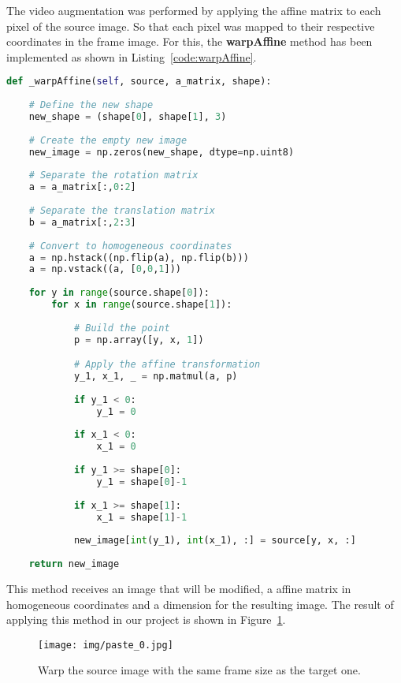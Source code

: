 \documentclass[]{IEEEtran}
\begin{document}
The video augmentation was performed by applying the affine matrix to each pixel of the source image. So that each pixel was mapped to their respective coordinates in the frame image. For this, the \textbf{warpAffine} method has been implemented as shown in Listing~\ref{code:warpAffine}.

\begin{lstlisting}[language=Python, caption={Warp Affine Method}, label={code:warpAffine}]
def _warpAffine(self, source, a_matrix, shape):
    
    # Define the new shape
    new_shape = (shape[0], shape[1], 3)
    
    # Create the empty new image
    new_image = np.zeros(new_shape, dtype=np.uint8)
    
    # Separate the rotation matrix
    a = a_matrix[:,0:2]
    
    # Separate the translation matrix
    b = a_matrix[:,2:3]
    
    # Convert to homogeneous coordinates
    a = np.hstack((np.flip(a), np.flip(b)))
    a = np.vstack((a, [0,0,1]))
    
    for y in range(source.shape[0]):
        for x in range(source.shape[1]):
            
            # Build the point
            p = np.array([y, x, 1])

            # Apply the affine transformation
            y_1, x_1, _ = np.matmul(a, p)
            
            if y_1 < 0:
                y_1 = 0
                
            if x_1 < 0:
                x_1 = 0
            
            if y_1 >= shape[0]:
                y_1 = shape[0]-1
                
            if x_1 >= shape[1]:
                x_1 = shape[1]-1
            
            new_image[int(y_1), int(x_1), :] = source[y, x, :]
    
    return new_image

\end{lstlisting}

This method receives an image that will be modified, a affine matrix in homogeneous coordinates and a dimension for the resulting image. The result of applying this method in our project is shown in Figure~\ref{fig:paste_0}.

\begin{figure}[H]
     \centering
     \texttt{[image: img/paste\_0.jpg]}
     \caption{Warp the source image with the same frame size as the target one.}
     \label{fig:paste_0}
\end{figure}
\end{document}
